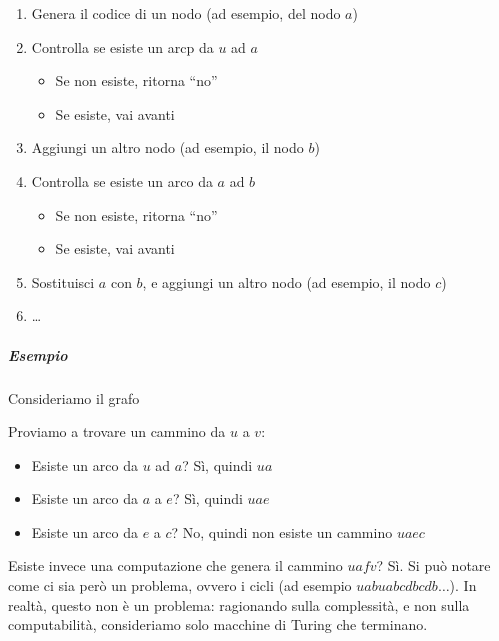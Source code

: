 \begin{enumerate}
    \item Genera il codice di un nodo (ad esempio, del nodo $a$)
    \item Controlla se esiste un arcp da $u$ ad $a$
    \begin{itemize}
        \item Se non esiste, ritorna ``no''
        \item Se esiste, vai avanti
    \end{itemize}
    \item Aggiungi un altro nodo (ad esempio, il nodo $b$)
    \item Controlla se esiste un arco da $a$ ad $b$
    \begin{itemize}
        \item Se non esiste, ritorna ``no''
        \item Se esiste, vai avanti
    \end{itemize}
    \item Sostituisci $a$ con $b$, e aggiungi un altro nodo (ad esempio, il nodo $c$)
    \item \dots
\end{enumerate}
\subparagraph{Esempio} Consideriamo il grafo
\begin{center}
\end{center}
Proviamo a trovare un cammino da $u$ a $v$:
\begin{itemize}
    \item Esiste un arco da $u$ ad $a$? Sì, quindi $ua$
    \item Esiste un arco da $a$ a $e$? Sì, quindi $uae$
    \item Esiste un arco da $e$ a $c$? No, quindi non esiste un cammino $uaec$
\end{itemize}
Esiste invece una computazione che genera il cammino $uafv$? Sì.
Si può notare come ci sia però un problema, ovvero i cicli (ad esempio $uabuabcdbcdb\dots$). In realtà, questo non è un problema: ragionando sulla complessità, e non sulla computabilità, consideriamo solo macchine di Turing che terminano.


